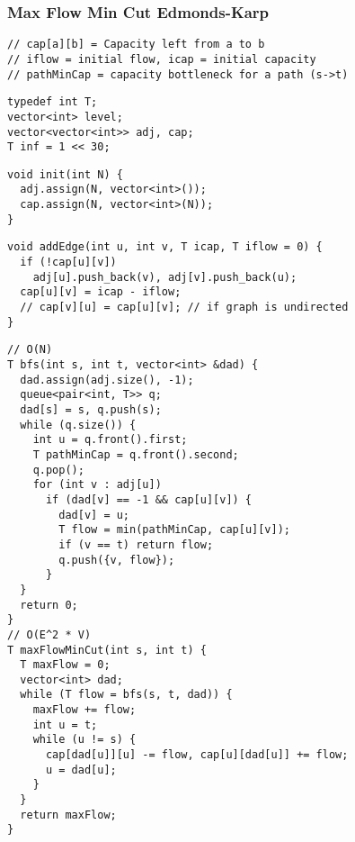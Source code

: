 \documentclass[twoside]{article}
\begin{document}
\begin{multicols*}{2}
\subsubsectionfont{\large\bfseries\sffamily\underline}
\subsubsection*{Max Flow Min Cut Edmonds-Karp}
\begin{verbatim}
// cap[a][b] = Capacity left from a to b
// iflow = initial flow, icap = initial capacity
// pathMinCap = capacity bottleneck for a path (s->t)
\end{verbatim}
\vspace{-12pt}
\begin{verbatim}
typedef int T;
vector<int> level;
vector<vector<int>> adj, cap;
T inf = 1 << 30;
\end{verbatim}
\vspace{-12pt}
\begin{verbatim}
void init(int N) {
  adj.assign(N, vector<int>());
  cap.assign(N, vector<int>(N));
}
\end{verbatim}
\vspace{-12pt}
\begin{verbatim}
void addEdge(int u, int v, T icap, T iflow = 0) {
  if (!cap[u][v])
    adj[u].push_back(v), adj[v].push_back(u);
  cap[u][v] = icap - iflow;
  // cap[v][u] = cap[u][v]; // if graph is undirected
}
\end{verbatim}
\vspace{-12pt}
\begin{verbatim}
// O(N)
T bfs(int s, int t, vector<int> &dad) {
  dad.assign(adj.size(), -1);
  queue<pair<int, T>> q;
  dad[s] = s, q.push(s);
  while (q.size()) {
    int u = q.front().first;
    T pathMinCap = q.front().second;
    q.pop();
    for (int v : adj[u])
      if (dad[v] == -1 && cap[u][v]) {
        dad[v] = u;
        T flow = min(pathMinCap, cap[u][v]);
        if (v == t) return flow;
        q.push({v, flow});
      }
  }
  return 0;
}
// O(E^2 * V)
T maxFlowMinCut(int s, int t) {
  T maxFlow = 0;
  vector<int> dad;
  while (T flow = bfs(s, t, dad)) {
    maxFlow += flow;
    int u = t;
    while (u != s) {
      cap[dad[u]][u] -= flow, cap[u][dad[u]] += flow;
      u = dad[u];
    }
  }
  return maxFlow;
}
\end{verbatim}

\subsectionfont{\bfseries\sffamily\centering\LARGE}
\vspace{0em}

\end{multicols*}
\end{document}
